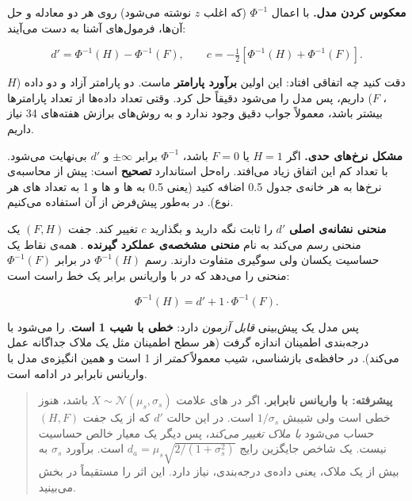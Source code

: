 \textbf{معکوس کردن مدل.} با اعمال \(\Phi^{-1}\) (که اغلب \(z\) نوشته
می‌شود) روی هر دو معادله و حل آن‌ها، فرمول‌های آشنا به دست می‌آیند:

\[
d' = \Phi^{-1}(H) - \Phi^{-1}(F), \qquad
c = -\tfrac{1}{2}\left[\Phi^{-1}(H) + \Phi^{-1}(F)\right].
\]

دقت کنید چه اتفاقی افتاد: این اولین \textbf{برآورد پارامتر} ماست. دو
پارامتر آزاد و دو داده (\(H\)، \(F\)) داریم، پس مدل را می‌شود دقیقاً حل
کرد. وقتی تعداد داده‌ها از تعداد پارامترها بیشتر باشد، معمولاً جواب دقیق
وجود ندارد و به روش‌های برازش هفته‌های 3\lr{--}4 نیاز داریم.

\textbf{مشکل نرخ‌های حدی.} اگر \(H = 1\) یا \(F = 0\) باشد، \(\Phi^{-1}\)
برابر \(\pm\infty\) و \(d'\) بی‌نهایت می‌شود. با تعداد  کم این
اتفاق زیاد می‌افتد. راه‌حل استاندارد \textbf{تصحیح } است:
پیش از محاسبه‌ی نرخ‌ها به هر خانه‌ی جدول 0.5 اضافه کنید (یعنی 0.5 به
ها و ها و 1 به تعداد های هر نوع). در
 به‌طور پیش‌فرض از آن استفاده می‌کنیم.

\textbf{منحنی  نشانه‌ی اصلی } \(d'\) را ثابت نگه دارید
و بگذارید \(c\) تغییر کند. جفت \((F, H)\) یک منحنی رسم می‌کند به نام
\textbf{منحنی مشخصه‌ی عملکرد گیرنده }. همه‌ی نقاط یک 
حساسیت یکسان ولی سوگیری متفاوت دارند. رسم \(\Phi^{-1}(H)\) در برابر
\(\Phi^{-1}(F)\) منحنی \textbf{} را می‌دهد که در  با
واریانس برابر یک خط راست است:

\[
\Phi^{-1}(H) = d' + 1 \cdot \Phi^{-1}(F).
\]

پس مدل یک پیش‌بینی \emph{قابل آزمون} دارد: \textbf{ خطی با شیب 1
است}.  را می‌شود با درجه‌بندی اطمینان 
اندازه گرفت (هر سطح اطمینان مثل یک ملاک جداگانه عمل می‌کند). در حافظه‌ی
بازشناسی، شیب  معمولاً \emph{کمتر} از 1 است و همین انگیزه‌ی مدل
با واریانس نابرابر در ادامه است.

\begin{quote}
\textbf{پیشرفته:  با واریانس نابرابر.} اگر در های
علامت \(X \sim \mathcal{N}(\mu_s,\allowbreak \sigma_s)\) باشد،  هنوز خطی
است ولی شیبش \(1/\sigma_s\) است. در این حالت \(d'\) که از یک جفت
\((H, F)\) حساب می‌شود \emph{با ملاک تغییر می‌کند}، پس دیگر یک معیار خالص
حساسیت نیست. یک شاخص جایگزین رایج
\(d_a = \mu_s \sqrt{2/(1+\sigma_s^2)}\) است. برآورد \(\sigma_s\) به بیش
از یک ملاک، یعنی داده‌ی درجه‌بندی، نیاز دارد. این اثر را مستقیماً در بخش
 می‌بینید.
\end{quote}

